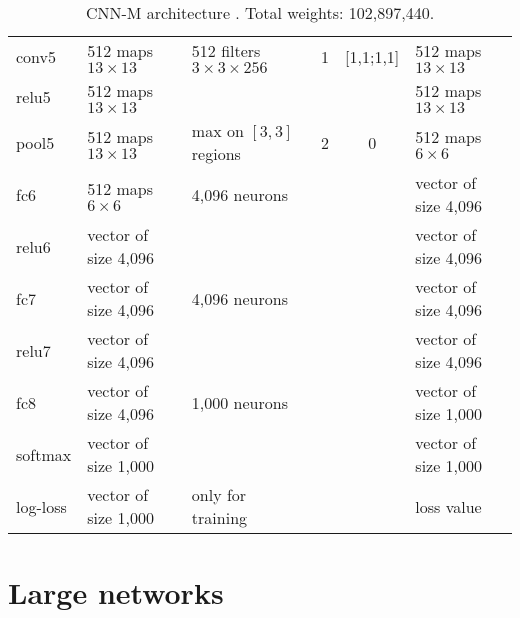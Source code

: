 \begin{table}[h]
\begin{center}
\begin{tabular}{|l||l||l|c|c||l|}
   \hline
   conv5      & 512 maps $13 \times 13$          & 512 filters $3 \times 3 \times 256$     & 1      & [1,1;1,1] & 512 maps $13 \times 13$  \\
   relu5      & 512 maps $13 \times 13$          &                                         &        &           & 512 maps $13 \times 13$  \\
   pool5      & 512 maps $13 \times 13$          & max on $[3,3]$ regions                  & 2      & 0         & 512 maps $6 \times 6$    \\
   \hline
   fc6        & 512 maps $6 \times 6$            & 4,096 neurons                           &        &           & vector of size 4,096     \\
   relu6      & vector of size 4,096             &                                         &        &           & vector of size 4,096     \\
   \hline
   fc7        & vector of size 4,096             & 4,096 neurons                           &        &           & vector of size 4,096     \\
   relu7      & vector of size 4,096             &                                         &        &           & vector of size 4,096     \\
   \hline
   fc8        & vector of size 4,096             & 1,000 neurons                           &        &           & vector of size 1,000     \\
   softmax    & vector of size 1,000             &                                         &        &           & vector of size 1,000     \\
   log-loss   & vector of size 1,000             & only for training                       &        &           & loss value               \\
   \hline 
 \end{tabular}
 \caption{CNN-M architecture \cite{Chatfield14}. Total weights: 102,897,440.}
 \label{table:CIFAR}
\end{center}
\end{table} 










\section{Large networks}

